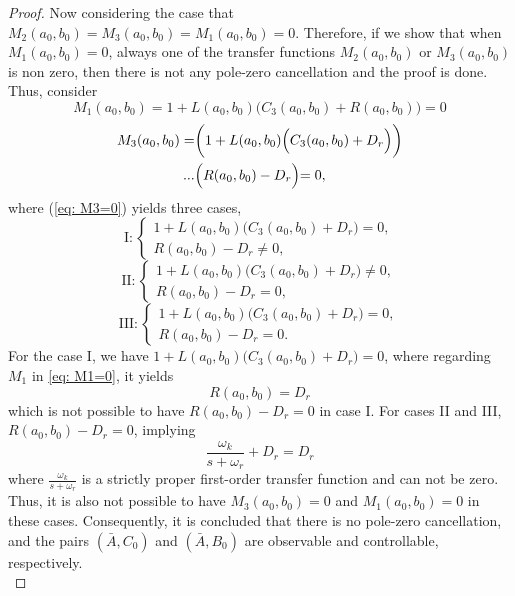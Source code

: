 \begin{proof}
Now considering the case that $M_2(a_0,b_0)=M_3(a_0,b_0)=M_1(a_0,b_0)=0$. Therefore, if we show that when $M_1(a_0,b_0)=0$, always one of the transfer functions $M_2(a_0,b_0)$ or $M_3(a_0,b_0)$ is non zero, then there is not any pole-zero cancellation and the proof is done. Thus, consider
\begin{equation}
M_1(a_0,b_0)=1+L(a_0,b_0)\Big(C_3(a_0,b_0)+R(a_0,b_0)\Big)=0
\label{eq: M1=0}
\end{equation}
\begin{equation}
\begin{split}
M_3(a_0,b_0)=&\bigg(1+L(a_0,b_0)\Big(C_3(a_0,b_0)+D_r\Big)\bigg)\\...&\Bigl(R(a_0,b_0)-D_r\Bigl)=0,
\label{eq: M3=0}
    \end{split}
\end{equation}
where (\ref{eq: M3=0}) yields three cases,
\begin{equation}
    \label{eq: case I}
   \text{I}:
    \begin{cases}
        1+L(a_0,b_0)\Big(C_3(a_0,b_0)+D_r\Big)=0,\\
        R(a_0,b_0)-D_r\neq0,
    \end{cases}
\end{equation}
\begin{equation}
    \label{eq: case II}
    \text{II}:
    \begin{cases}
        1+L(a_0,b_0)\Big(C_3(a_0,b_0)+D_r\Big)\neq0,\\
        R(a_0,b_0)-D_r=0,
    \end{cases}
\end{equation}
\begin{equation}
    \label{eq: case III}
    \text{III}:
    \begin{cases}
        1+L(a_0,b_0)\Big(C_3(a_0,b_0)+D_r\Big)=0,\\
        R(a_0,b_0)-D_r=0.
    \end{cases}
\end{equation}
For the case I, we have $ 1+L(a_0,b_0)\Big(C_3(a_0,b_0)+D_r\Big)=0$, where regarding $M_1$ in \eqref{eq: M1=0}, it yields
\begin{equation}
    R(a_0,b_0)=D_r
\end{equation}
which is not possible to have $R(a_0, b_0) - D_r = 0$ in case I. For cases II and III, $R(a_0, b_0) - D_r = 0$, implying
\begin{equation}
    \frac{\omega_k}{s+\omega_r}+D_r=D_r
\end{equation}
where $ \frac{\omega_k}{s+\omega_r}$ is a strictly proper first-order transfer function and can not be zero. Thus, it is also not possible to have $M_3(a_0, b_0) = 0$ and $M_1(a_0, b_0) = 0$ in these cases. Consequently, it is concluded that there is no pole-zero cancellation, and the pairs $(\bar{A}, C_0)$ and $(\bar{A}, B_0)$ are observable and controllable, respectively. \\


\end{proof}
